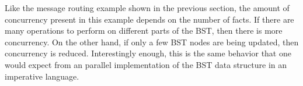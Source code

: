 Like the message routing example shown in the previous section, the amount of
concurrency present in this example depends on the number of 
facts. If there are many  operations to perform on different parts
of the BST, then there is more concurrency. On the other hand, if only a few BST
nodes are being updated, then concurrency is reduced. Interestingly enough, this
is the same behavior that one would expect from an parallel implementation of
the BST data structure in an imperative language.
